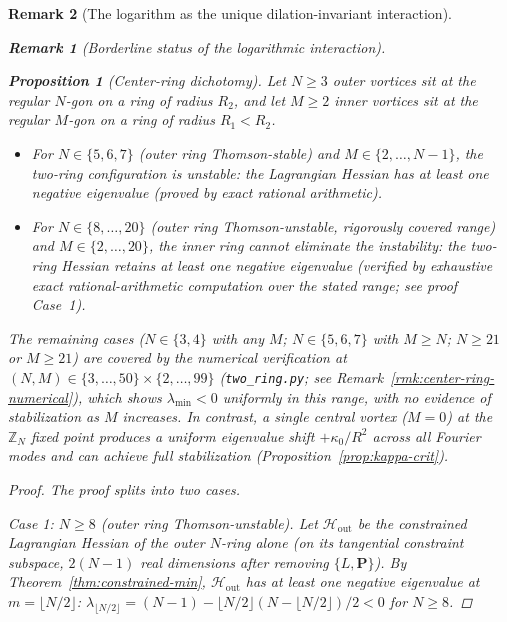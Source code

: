\documentclass[12pt, a4paper]{article}
\newtheorem{proposition}[theorem]{Proposition}
\newtheorem{remark}{Remark}[section]
\numberwithin{equation}{section}
\begin{document}
\begin{remark}[The logarithm as the unique dilation-invariant interaction]
\begin{remark}[Borderline status of the logarithmic interaction]
\begin{proposition}[Center-ring dichotomy]\label{prop:center-ring}
Let $N \ge 3$ outer vortices sit at the regular $N$-gon on a ring
of radius $R_2$, and let $M \ge 2$ inner vortices sit at the regular
$M$-gon on a ring of radius $R_1 < R_2$.
\begin{itemize}
  \item[(i)] For $N \in \{5, 6, 7\}$ (outer ring Thomson-stable)
    and $M \in \{2, \ldots, N{-}1\}$, the two-ring configuration is
    \emph{unstable}: the Lagrangian Hessian has at least one
    negative eigenvalue (proved by exact rational arithmetic).
  \item[(ii)] For $N \in \{8, \ldots, 20\}$
    (outer ring Thomson-unstable, rigorously covered range)
    and $M \in \{2, \ldots, 20\}$, the inner ring cannot eliminate
    the instability: the two-ring Hessian retains at least one
    negative eigenvalue (verified by exhaustive exact
    rational-arithmetic computation over the stated range;
    see proof Case~1).
\end{itemize}
The remaining cases ($N \in \{3, 4\}$ with any $M$;
$N \in \{5,6,7\}$ with $M \ge N$; $N \ge 21$ or $M \ge 21$)
are covered by the numerical verification at
$(N, M) \in \{3, \ldots, 50\} \times \{2, \ldots, 99\}$
(\texttt{two\_ring.py}; see Remark~\ref{rmk:center-ring-numerical}),
which shows $\lambda_{\min} < 0$ uniformly in this range,
with no evidence of stabilization as $M$ increases.
In contrast, a single central vortex ($M = 0$) at the
$\mathbb{Z}_N$ fixed point produces a \emph{uniform} eigenvalue
shift $+\kappa_0/R^2$ across all Fourier modes and can achieve
full stabilization (Proposition~\ref{prop:kappa-crit}).
\end{proposition}

\begin{proof}
The proof splits into two cases.

\emph{Case 1: $N \ge 8$ (outer ring Thomson-unstable).}
Let $\mathcal{H}_{\mathrm{out}}$ be the constrained Lagrangian
Hessian of the outer $N$-ring alone (on its tangential constraint
subspace, $2(N{-}1)$ real dimensions after removing
$\{L, \mathbf{P}\}$).  By Theorem~\ref{thm:constrained-min},
$\mathcal{H}_{\mathrm{out}}$ has at least one negative eigenvalue
at $m = \lfloor N/2\rfloor$:
$\lambda_{\lfloor N/2\rfloor} = (N{-}1) - \lfloor N/2\rfloor
(N{-}\lfloor N/2\rfloor)/2 < 0$ for $N \ge 8$.


\end{proof}
\end{remark}
\end{remark}
\end{document}
